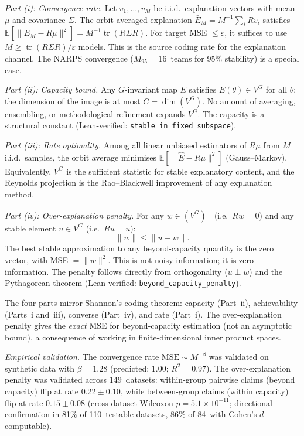 \documentclass[11pt,a4paper]{article}
\begin{document}
\emph{Part (i): Convergence rate.}  Let $v_1, \ldots, v_M$ be i.i.d.\ explanation vectors with mean $\mu$ and covariance $\Sigma$.  The orbit-averaged explanation $\bar{E}_M = M^{-1} \sum_i R v_i$ satisfies
$\mathbb{E}[\|\bar{E}_M - R\mu\|^2] = M^{-1} \operatorname{tr}(R\Sigma R)$.
For target MSE $\leq \varepsilon$, it suffices to use $M \geq \operatorname{tr}(R\Sigma R)/\varepsilon$ models.  This is the source coding rate for the explanation channel.  The NARPS convergence ($M_{95} = 16$~teams for 95\% stability) is a special case.

\emph{Part (ii): Capacity bound.}  Any $G$-invariant map $E$ satisfies $E(\theta) \in V^G$ for all $\theta$; the dimension of the image is at most $C = \dim(V^G)$.  No amount of averaging, ensembling, or methodological refinement expands $V^G$.  The capacity is a structural constant (Lean-verified: \texttt{stable\_in\_fixed\_subspace}).

\emph{Part (iii): Rate optimality.}  Among all linear unbiased estimators of $R\mu$ from $M$ i.i.d.\ samples, the orbit average minimises $\mathbb{E}[\|\hat{E} - R\mu\|^2]$ (Gauss--Markov).  Equivalently, $V^G$ is the sufficient statistic for stable explanatory content, and the Reynolds projection is the Rao--Blackwell improvement of any explanation method.

\emph{Part (iv): Over-explanation penalty.}  For any $w \in (V^G)^\perp$ (i.e.\ $Rw = 0$) and any stable element $u \in V^G$ (i.e.\ $Ru = u$):
\[
  \|w\| \leq \|u - w\|.
\]
The best stable approximation to any beyond-capacity quantity is the zero vector, with MSE $= \|w\|^2$.  This is not noisy information; it is zero information.  The penalty follows directly from orthogonality ($u \perp w$) and the Pythagorean theorem (Lean-verified: \texttt{beyond\_capacity\_penalty}).

The four parts mirror Shannon's coding theorem: capacity (Part~ii), achievability (Parts~i and~iii), converse (Part~iv), and rate (Part~i).  The over-explanation penalty gives the \emph{exact} MSE for beyond-capacity estimation (not an asymptotic bound), a consequence of working in finite-dimensional inner product spaces.

\emph{Empirical validation.}  The convergence rate $\text{MSE} \sim M^{-\beta}$ was validated on synthetic data with $\beta = 1.28$ (predicted: $1.00$; $R^2 = 0.97$).  The over-explanation penalty was validated across 149~datasets: within-group pairwise claims (beyond capacity) flip at rate $0.22 \pm 0.10$, while between-group claims (within capacity) flip at rate $0.15 \pm 0.08$ (cross-dataset Wilcoxon $p = 5.1 \times 10^{-11}$; directional confirmation in 81\% of 110~testable datasets, 86\% of 84~with Cohen's $d$ computable).
\end{document}
